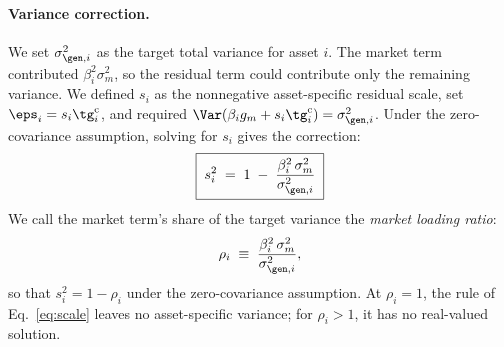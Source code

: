 \paragraph{Variance correction.}

We set $\sigma_{\gen,i}^2$ as the target total variance for asset $i$.
The market term contributed $\beta_i^2\sigma_m^2$, so the residual term
could contribute only the remaining variance. We defined $s_i$ as the
nonnegative asset-specific residual scale, set
$\eps_i=s_i\tg_i^{\mathrm c}$, and required
$\Var(\beta_i g_m+s_i\tg_i^{\mathrm c})=\sigma_{\gen,i}^2$. Under the
zero-covariance assumption, solving for $s_i$ gives the correction:
\begin{equation}
  \boxed{\;s_i^2 \;=\; 1 \;-\; \frac{\beta_i^2\, \sigma_m^2}{\sigma_{\gen,i}^2}\;}
  \label{eq:scale}
\end{equation}
We call the market term's share of the target variance the
\emph{market loading ratio}:
\begin{equation}
  \rho_i \;\equiv\; \frac{\beta_i^2\, \sigma_m^2}{\sigma_{\gen,i}^2},
  \label{eq:rho}
\end{equation}
so that $s_i^2=1-\rho_i$ under the zero-covariance assumption. At
$\rho_i=1$, the rule of Eq.~\eqref{eq:scale} leaves no asset-specific
variance; for $\rho_i>1$, it has no real-valued solution.

